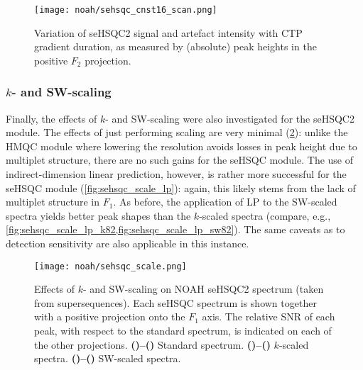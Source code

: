 \begin{figure}[!ht]
    \centering
    \texttt{[image: noah/sehsqc\_cnst16\_scan.png]}%
    \caption[Variation of seHSQC2 signal and artefact intensity with CTP gradient duration]{
        Variation of seHSQC2 signal and artefact intensity with CTP gradient duration, as measured by (absolute) peak heights in the positive $F_2$ projection.
    }
    \label{fig:sehsqc_cnst16}
\end{figure}


\subsubsection{$k$- and SW-scaling}

Finally, the effects of $k$- and SW-scaling were also investigated for the seHSQC2 module.
The effects of just performing scaling are very minimal (\cref{fig:sehsqc_scale}): unlike the HMQC module where lowering the resolution avoids losses in peak height due to multiplet structure, there are no such gains for the seHSQC module.
The use of indirect-dimension linear prediction, however, is rather more successful for the seHSQC module (\cref{fig:sehsqc_scale_lp}): again, this likely stems from the lack of multiplet structure in $F_1$.
As before, the application of LP to the SW-scaled spectra yields better peak shapes than the $k$-scaled spectra (compare, e.g., \cref{fig:sehsqc_scale_lp_k82,fig:sehsqc_scale_lp_sw82}).
The same caveats as to detection sensitivity are also applicable in this instance.

\begin{figure}[!htbp]
    \centering
    \texttt{[image: noah/sehsqc\_scale.png]}%
    {\label{fig:sehsqc_scale_std2}}%
    {\label{fig:sehsqc_scale_std1}}%
    {\label{fig:sehsqc_scale_k22}}%
    {\label{fig:sehsqc_scale_k21}}%
    {\label{fig:sehsqc_scale_k42}}%
    {\label{fig:sehsqc_scale_k41}}%
    {\label{fig:sehsqc_scale_k82}}%
    {\label{fig:sehsqc_scale_k81}}%
    {\label{fig:sehsqc_scale_sw22}}%
    {\label{fig:sehsqc_scale_sw21}}%
    {\label{fig:sehsqc_scale_sw42}}%
    {\label{fig:sehsqc_scale_sw41}}%
    {\label{fig:sehsqc_scale_sw82}}%
    {\label{fig:sehsqc_scale_sw81}}%
    \caption[Effects of $k$- and SW-scaling on NOAH seHSQC2 spectrum]{
        Effects of $k$- and SW-scaling on NOAH seHSQC2 spectrum (taken from  supersequences).
        Each seHSQC spectrum is shown together with a positive projection onto the $F_1$ axis.
        The relative SNR of each peak, with respect to the standard spectrum, is indicated on each of the other projections.
        \textbf{()--()} Standard spectrum.
        \textbf{()--()} $k$-scaled spectra.
        \textbf{()--()} SW-scaled spectra.
    }
    \label{fig:sehsqc_scale}
\end{figure}

